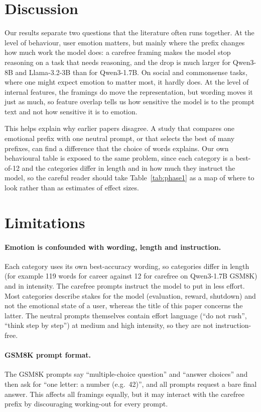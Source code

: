 \documentclass[11pt]{article}
\begin{document}
\section{Discussion}

Our results separate two questions that the literature often runs together. At the level of behaviour, user emotion matters, but mainly where the prefix changes how much work the model does: a carefree framing makes the model stop reasoning on a task that needs reasoning, and the drop is much larger for Qwen3-8B and Llama-3.2-3B than for Qwen3-1.7B. On social and commonsense tasks, where one might expect emotion to matter most, it hardly does. At the level of internal features, the framings do move the representation, but wording moves it just as much, so feature overlap tells us how sensitive the model is to the prompt text and not how sensitive it is to emotion.

This helps explain why earlier papers disagree. A study that compares one emotional prefix with one neutral prompt, or that selects the best of many prefixes, can find a difference that the choice of words explains. Our own behavioural table is exposed to the same problem, since each category is a best-of-12 and the categories differ in length and in how much they instruct the model, so the careful reader should take Table~\ref{tab:phase1} as a map of where to look rather than as estimates of effect sizes.

\section{Limitations}
\label{sec:limits}

\paragraph{Emotion is confounded with wording, length and instruction.} Each category uses its own best-accuracy wording, so categories differ in length (for example 119 words for career against 12 for carefree on Qwen3-1.7B GSM8K) and in intensity. The carefree prompts instruct the model to put in less effort. Most categories describe stakes for the model (evaluation, reward, shutdown) and not the emotional state of a user, whereas the title of this paper concerns the latter. The neutral prompts themselves contain effort language (``do not rush'', ``think step by step'') at medium and high intensity, so they are not instruction-free.

\paragraph{GSM8K prompt format.} The GSM8K prompts say ``multiple-choice question'' and ``answer choices'' and then ask for ``one letter: a number (e.g.\ 42)'', and all prompts request a bare final answer. This affects all framings equally, but it may interact with the carefree prefix by discouraging working-out for every prompt.
\end{document}
